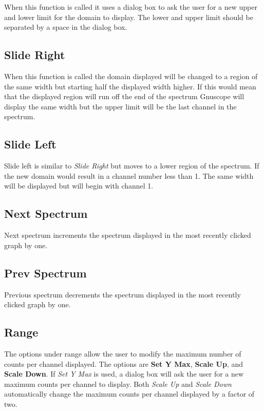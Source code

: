 When this function is called it uses a dialog box to ask the user for a new upper and lower limit for the domain to display.  The lower and upper limit should be separated by a space in the dialog box.

\subsection{Slide Right}

When this function is called the domain displayed will be changed to a region of the same width but starting half the displayed width higher.  If this would mean that the displayed region will run off the end of the spectrum Gnuscope will display the same width but the upper limit will be the last channel in the spectrum.

\subsection{Slide Left}

Slide left is similar to {\it Slide Right} but moves to a lower region of the spectrum.  If the new domain would result in a channel number less than 1.  The same width will be displayed but will begin with channel 1.

\subsection{Next Spectrum}

Next spectrum increments the spectrum displayed in the most recently clicked graph by one.

\subsection{Prev Spectrum}

Previous spectrum decrements the spectrum displayed in the most recently clicked graph by one.

\subsection{Range}

The options under range allow the user to modify the maximum number of counts per channel displayed.  The options are {\bf Set Y Max}, {\bf Scale Up}, and {\bf Scale Down}.  If {\it Set Y Max} is used, a dialog box will ask the user for a new maximum counts per channel to display.  Both {\it Scale Up} and {\it Scale Down} automatically change the maximum counts per channel displayed by a factor of two.

